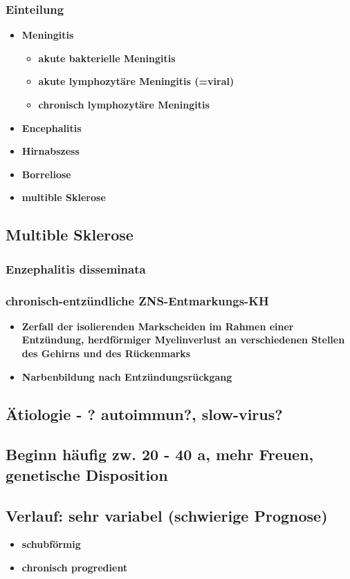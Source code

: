 		\subsubsection*{Einteilung}
			\begin{itemize}
				\item \textbf{Meningitis}
					\begin{itemize}
						\item \textbf{akute bakterielle Meningitis}
						\item \textbf{akute lymphozytäre Meningitis (=viral)}
						\item \textbf{chronisch lymphozytäre Meningitis}
					\end{itemize}
				\item \textbf{Encephalitis}
				\item \textbf{Hirnabszess}
				\item \textbf{Borreliose}
				\item \textbf{multible Sklerose}
			\end{itemize}
	\subsection*{Multible Sklerose}
		\subsubsection*{Enzephalitis disseminata}
		\subsubsection*{chronisch-entzündliche ZNS-Entmarkungs-KH}
			\begin{itemize}
				\item \textbf{Zerfall der isolierenden Markscheiden im Rahmen einer Entzündung, herdförmiger Myelinverlust an verschiedenen Stellen des Gehirns und des Rückenmarks}
				\item \textbf{Narbenbildung nach Entzündungsrückgang}
			\end{itemize}
		\subsection*{Ätiologie - ? autoimmun?, slow-virus?}
		\subsection*{Beginn häufig zw. 20 - 40 a, mehr Freuen, genetische Disposition}
		\subsection*{Verlauf: sehr variabel (schwierige Prognose)}
			\begin{itemize}
				\item \textbf{schubförmig}
				\item \textbf{chronisch progredient}
			\end{itemize}
